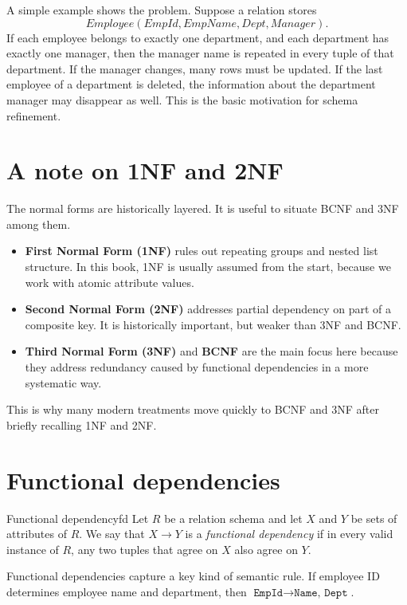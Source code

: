 \documentclass[11pt,a4paper,openany]{book}
\begin{document}
A simple example shows the problem. Suppose a relation stores
\[
Employee(EmpId, EmpName, Dept, Manager).
\]
If each employee belongs to exactly one department, and each department has exactly one manager, then the manager name is repeated in every tuple of that department. If the manager changes, many rows must be updated. If the last employee of a department is deleted, the information about the department manager may disappear as well. This is the basic motivation for schema refinement.

\section{A note on 1NF and 2NF}
The normal forms are historically layered. It is useful to situate BCNF and 3NF among them.

\begin{itemize}
\item \textbf{First Normal Form (1NF)} rules out repeating groups and nested list structure. In this book, 1NF is usually assumed from the start, because we work with atomic attribute values.
\item \textbf{Second Normal Form (2NF)} addresses partial dependency on part of a composite key. It is historically important, but weaker than 3NF and BCNF.
\item \textbf{Third Normal Form (3NF)} and \textbf{BCNF} are the main focus here because they address redundancy caused by functional dependencies in a more systematic way.
\end{itemize}

This is why many modern treatments move quickly to BCNF and 3NF after briefly recalling 1NF and 2NF.

\section{Functional dependencies}
\begin{definition}{Functional dependency}{fd}
Let \(R\) be a relation schema and let \(X\) and \(Y\) be sets of attributes of \(R\). We say that \(X \to Y\) is a \emph{functional dependency} if in every valid instance of \(R\), any two tuples that agree on \(X\) also agree on \(Y\).
\end{definition}

Functional dependencies capture a key kind of semantic rule. If employee ID determines employee name and department, then \(\texttt{EmpId} \to \texttt{Name, Dept}\).
\end{document}
